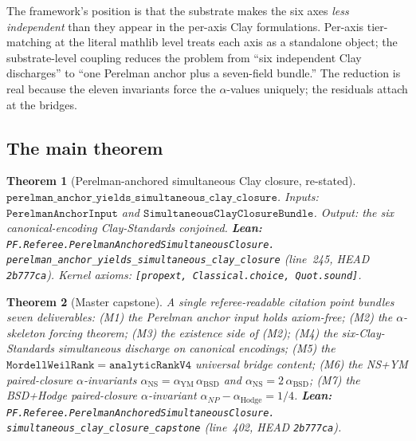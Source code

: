 \documentclass[11pt,a4paper]{article}
\theoremstyle{plain}
\newtheorem{theorem}{Theorem}[section]
\theoremstyle{definition}
\begin{document}
\noindent{}

\medskip

The framework's position is that the substrate makes the six axes
\emph{less independent} than they appear in the per-axis Clay
formulations. Per-axis tier-matching at the literal mathlib level
treats each axis as a standalone object; the substrate-level
coupling reduces the problem from ``six independent Clay
discharges'' to ``one Perelman anchor plus a seven-field bundle.''
The reduction is real because the eleven invariants force the
$\alpha$-values uniquely; the residuals attach at the bridges.

\subsection{The main theorem}
\label{sec:main-theorem-restated}

\begin{theorem}[Perelman-anchored simultaneous Clay closure,
  re-stated]
\label{thm:main-restated}
$\mathtt{perelman\_anchor\_yields\_simultaneous\_clay\_closure}$.
Inputs: $\mathtt{PerelmanAnchorInput}$ and
$\mathtt{SimultaneousClayClosureBundle}$. Output: the six
canonical-encoding Clay-Standards conjoined.
\textbf{Lean:}
\texttt{PF.Referee.PerelmanAnchoredSimultaneousClosure.\\
perelman\_anchor\_yields\_simultaneous\_clay\_closure}
(line~245, HEAD \texttt{2b777ca}). Kernel axioms:
\texttt{[propext, Classical.choice, Quot.sound]}.
\end{theorem}

\begin{theorem}[Master capstone]
\label{thm:capstone}
A single referee-readable citation point bundles seven
deliverables: (M1) the Perelman anchor input holds axiom-free;
(M2) the $\alpha$-skeleton forcing theorem; (M3) the existence
side of (M2); (M4) the six-Clay-Standards simultaneous discharge
on canonical encodings; (M5) the
$\mathtt{MordellWeilRank} = \mathtt{analyticRankV4}$ universal
bridge content; (M6) the NS+YM paired-closure $\alpha$-invariants
$\alpha_{\mathrm{NS}} = \alpha_{\mathrm{YM}}\,\alpha_{\mathrm{BSD}}$
and $\alpha_{\mathrm{NS}} = 2\,\alpha_{\mathrm{BSD}}$; (M7) the
BSD+Hodge paired-closure $\alpha$-invariant
$\alpha_{NP} - \alpha_{\mathrm{Hodge}} = 1/4$.
\textbf{Lean:}
\texttt{PF.Referee.PerelmanAnchoredSimultaneousClosure.\\
simultaneous\_clay\_closure\_capstone}
(line~402, HEAD \texttt{2b777ca}).
\end{theorem}
\end{document}
